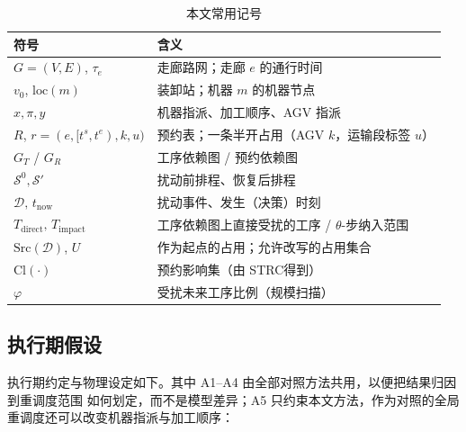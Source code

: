 \documentclass[manuscript,screen,review]{acmart}
\providecommand{\STRC}{\textsc{STRC}}
\begin{document}
\begin{table}[t]
\centering
\caption{本文常用记号}
\label{tab:notation}
\small
\begin{tabular}{@{}ll@{}}
\toprule
\textbf{符号} & \textbf{含义} \\
\midrule
\(G=(V,E)\), \(\tau_e\) & 走廊路网；走廊 \(e\) 的通行时间 \\
\(v_0\), \(\mathrm{loc}(m)\) & 装卸站；机器 \(m\) 的机器节点 \\
\(x,\pi,y\) & 机器指派、加工顺序、AGV 指派 \\
\(R\), \(r=(e,[t^s,t^e),k,u)\) & 预约表；一条半开占用（AGV \(k\)，运输段标签 \(u\)）\\
\(G_T\) / \(G_R\) & 工序依赖图 / 预约依赖图 \\
\(\mathcal{S}^0,\mathcal{S}'\) & 扰动前排程、恢复后排程 \\
\(\mathcal{D},\,t_{\mathrm{now}}\) & 扰动事件、发生（决策）时刻 \\
\(T_{\mathrm{direct}},\,T_{\mathrm{impact}}\) & 工序依赖图上直接受扰的工序 / \(\theta\)-步纳入范围 \\
\(\mathrm{Src}(\mathcal{D})\), \(U\) & 作为起点的占用；允许改写的占用集合 \\
\(\mathrm{Cl}(\cdot)\) & 预约影响集（由 \STRC 得到）\\
\(\varphi\) & 受扰未来工序比例（规模扫描）\\
\bottomrule
\end{tabular}
\end{table}

\subsection{执行期假设}
\label{sec:assumptions}

执行期约定与物理设定如下。其中 A1--A4 由全部对照方法共用，以便把结果归因到重调度范围
如何划定，而不是模型差异；A5 只约束本文方法，作为对照的全局重调度还可以改变机器指派与加工顺序：
\end{document}
